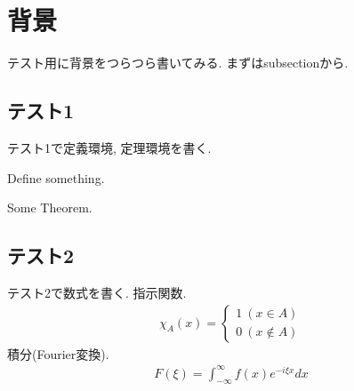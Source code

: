 \documentclass[../master.tex]{subfiles}
\begin{document}
    \section{背景}
    テスト用に背景をつらつら書いてみる. まずはsubsectionから.
        \subsection{テスト1}
        テスト1で定義環境, 定理環境を書く.
            \begin{dfn}
                Define something.
            \end{dfn}
            \begin{thm}
                Some Theorem.
            \end{thm}
        \subsection{テスト2}
        テスト2で数式を書く. 指示関数.
            \begin{align*}
                \mathbb{\chi}_A(x)=
                \begin{cases}
                    1\ (x\in A) \\
                    0\ (x \notin A)
                \end{cases}
            \end{align*}
        積分(Fourier変換).
            \begin{align*}
                F(\xi)
                =
                \int_{-\infty}^{\infty}
                    f(x)e^{-i\xi x}dx
            \end{align*}
\end{document}
